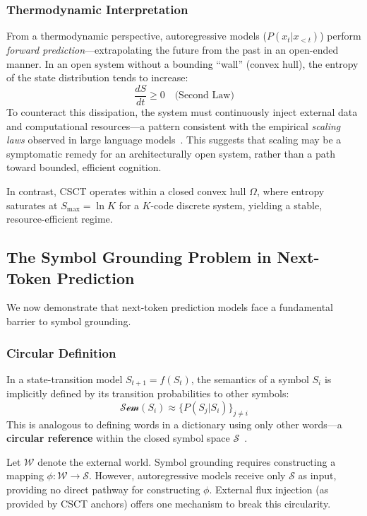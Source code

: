 \documentclass{article}
\begin{document}
\subsubsection{Thermodynamic Interpretation}

From a thermodynamic perspective, autoregressive models ($P(x_t | x_{<t})$) perform \emph{forward prediction}---extrapolating the future from the past in an open-ended manner.
In an open system without a bounding ``wall'' (convex hull), the entropy of the state distribution tends to increase:
\begin{equation}
    \frac{dS}{dt} \geq 0 \quad \text{(Second Law)}
\end{equation}
To counteract this dissipation, the system must continuously inject external data and computational resources---a pattern consistent with the empirical \emph{scaling laws} observed in large language models~\cite{kaplan2020scaling}.
This suggests that scaling may be a symptomatic remedy for an architecturally open system, rather than a path toward bounded, efficient cognition.

In contrast, CSCT operates within a closed convex hull $\Omega$, where entropy saturates at $S_{\max} = \ln K$ for a $K$-code discrete system, yielding a stable, resource-efficient regime.

\subsection{The Symbol Grounding Problem in Next-Token Prediction}

We now demonstrate that next-token prediction models face a fundamental barrier to symbol grounding.

\subsubsection{Circular Definition}

In a state-transition model $S_{t+1} = f(S_t)$, the semantics of a symbol $S_i$ is implicitly defined by its transition probabilities to other symbols:
\begin{equation}
    \mathcal{Sem}(S_i) \approx \{ P(S_j | S_i) \}_{j \neq i}
\end{equation}
This is analogous to defining words in a dictionary using only other words---a \textbf{circular reference} within the closed symbol space $\mathcal{S}$~\cite{harnad1990symbol}.

Let $\mathcal{W}$ denote the external world.
Symbol grounding requires constructing a mapping $\phi: \mathcal{W} \to \mathcal{S}$.
However, autoregressive models receive only $\mathcal{S}$ as input, providing no direct pathway for constructing $\phi$.
External flux injection (as provided by CSCT anchors) offers one mechanism to break this circularity.
\end{document}
